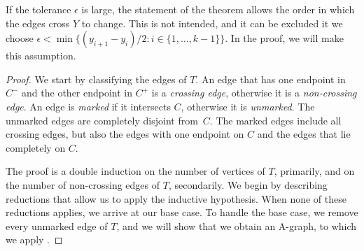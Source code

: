 If the tolerance $\epsilon$ is large, 
the statement of the theorem allows the order in which the edges cross
$Y$ to change. This is not intended, and it can be excluded it we choose
$\epsilon<\min\{(y_{i+1}-y_i)/2:i\in\{1,\ldots,k-1\}\}$. In the proof,
we will make this assumption.

\begin{proof}
  We start by classifying the edges of $T$.  An edge that has one
  endpoint in $C^-$ and the other endpoint in $C^+$ is a \emph{crossing
    edge}, otherwise it is a \emph{non-crossing edge}.
%
  An edge
  is \emph{marked} if it intersects $C$, otherwise it is
  \emph{unmarked}.  The unmarked edges are completely disjoint
  from~$C$.  The marked edges include all crossing edges, but also the
  edges with one endpoint on $C$ and the edges that lie completely on
  $C$.
	
	
	
	The proof is a double induction on the number of vertices of $T$, primarily, and on the number of non-crossing edges of $T$, secondarily.
	We begin by describing reductions that allow us to apply the
	inductive hypothesis. When none of these reductions applies,
	we arrive at our base case. To handle the base case,
	we remove every unmarked edge of $T$, and we will show that we obtain an A-graph, to which we
	apply .


\end{proof}
